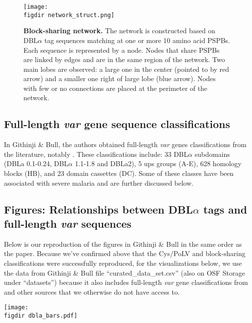 \documentclass[10pt,twocolumn,superscriptaddress]{revtex4-1}
\newcommand{\var}{{\it var}\xspace}
\newcommand{\dbla}{{DBL$\alpha$}\xspace}
\newcommand{\cp}{{Cys/PoLV}\xspace}
\newcommand{\paper}{{Githinji \& Bull}\xspace}
\newcommand{\figdir}{figures/}
\begin{document}
\begin{figure}[t]
	\centering
	\texttt{[image: \\figdir network\_struct.png]}
	\caption{{\bf Block-sharing network.} The network is constructed based on \dbla tag sequences matching at one or more 10 amino acid PSPBs. Each sequence is represented by a node. Nodes that share PSPBs are linked by edges and are in the same region of the network. Two main lobes are observed: a large one in the center (pointed to by red arrow) and a smaller one right of large lobe (blue arrow). Nodes with few or no connections are placed at the perimeter of the network.}
	\label{struct}
\end{figure}

\subsection{Full-length \var gene sequence classifications}
In \paper \cite{githinji2017}, the authors obtained full-length \var genes classifications from the literature, notably \cite{rask2010}. These classifications include: 33 \dbla subdomains (DBLa 0.1-0.24, \dbla 1.1-1.8 and DBLa2), 5 ups groups (A-E), 628 homology blocks (HB), and 23 domain cassettes (DC). Some of these classes have been associated with severe malaria and are further discussed below. 

\subsection{Figures: Relationships between \dbla tags and full-length \var sequences}
Below is our reproduction of the figures in \paper in the same order as the paper. Because we've confirmed above that the \cp and block-sharing classifications were successfully reproduced, for the visualizations below, we use the data from \paper file ``curated\_data\_set.csv'' (also on OSF Storage under ``datasets'') because it also includes full-length \var gene classifications from \cite{rask2010} and other sources that we otherwise do not have access to. 



\begin{figure*}[t]
	\centering
	\texttt{[image: \\figdir dbla\_bars.pdf]}
	\caption{{\bf Correspondence between \var sequence classifications and presence of specific \dbla domains}. \var sequences are classified based on \dbla domains (horizontal axis) they contain. The proportion of the genes carrying other sequence features (ups, \cp, block-sharing groups, select homology blocks) is shown on the vertical axis. Like in \paper, the \dbla domains are, from left to right, in order of decreasing upsA sequences.}
	\label{dbla_bars}
\end{figure*}
\end{document}

